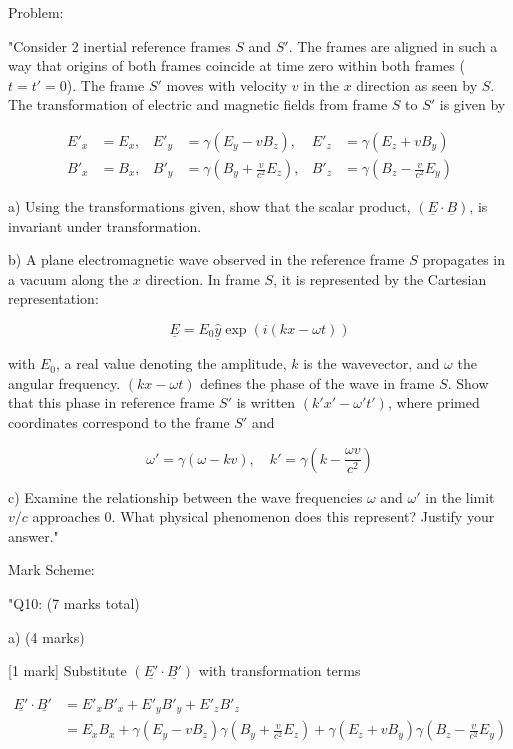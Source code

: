 Problem:

"Consider 2 inertial reference frames \( S \) and \( S' \). The frames are aligned in such a way that origins of both frames coincide at time zero within both frames (\( t = t' = 0 \)). The frame \( S' \) moves with velocity \( v \) in the \( x \) direction as seen by \( S \). The transformation of electric and magnetic fields from frame \( S \) to \( S' \) is given by 

\[
\begin{aligned}
E'_{x} &= E_{x}, & E'_{y} &= \gamma(E_{y} - vB_{z}), & E'_{z} &= \gamma(E_{z} + vB_{y}) \\
B'_{x} &= B_{x}, & B'_{y} &= \gamma(B_{y} + \frac{v}{c^{2}} E_{z}), & B'_{z} &= \gamma(B_{z} - \frac{v}{c^{2}} E_{y})
\end{aligned}
\]

a) Using the transformations given, show that the scalar product, \( (\underline{E} \cdot \underline{B}) \), is invariant under transformation.

b) A plane electromagnetic wave observed in the reference frame \( S \) propagates in a vacuum along the \( x \) direction. In frame \( S \), it is represented by the Cartesian representation: 

\[ \underline{E} = E_{0} \hat{\underline{y}} \exp(i(kx - \omega t)) \]

with \( E_{0} \), a real value denoting the amplitude, \( k \) is the wavevector, and \( \omega \) the angular frequency. \( (kx - \omega t) \) defines the phase of the wave in frame \( S \). Show that this phase in reference frame \( S' \) is written \( (k'x' - \omega' t') \), where primed coordinates correspond to the frame \( S' \) and

\[ \omega' = \gamma(\omega - kv), \quad k' = \gamma(k - \frac{\omega v}{c^{2}}) \]

c) Examine the relationship between the wave frequencies \( \omega \) and \( \omega' \) in the limit \( v/c \) approaches \( 0 \). What physical phenomenon does this represent? Justify your answer."

Mark Scheme:

"{Q10: (7 marks total)}

a) (4 marks)

[1 mark] Substitute \( (\underline{E'} \cdot \underline{B'}) \) with transformation terms

\begin{align*}
    \underline{E'} \cdot \underline{B'} & = E'_x B'_x + E'_y B'_y + E'_z B'_z \\ & = E_{x} B_{x} + \gamma(E_{y} - vB_{z}) \gamma(B_{y} + \frac{v}{c^{2}} E_{z}) + \gamma(E_{z} + vB_{y}) \gamma(B_{z} - \frac{v}{c^{2}} E_{y})
\end{align*}

